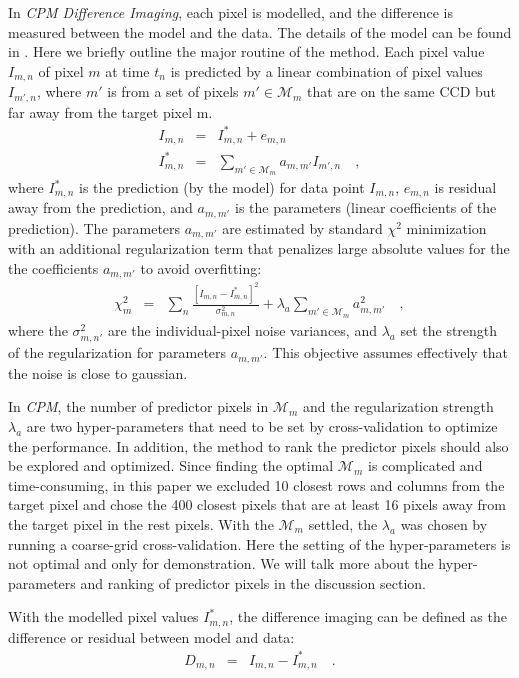 \documentclass[12pt, preprint]{aastex}
\newcommand{\project}[1]{\textsl{#1}}
\newcommand{\cpm}{\project{CPM}}
\newcommand{\cpmdiff}{\project{CPM Difference Imaging}}
\newcommand{\set}[1]{\mathcal{#1}}
\begin{document}
In \cpmdiff, each pixel is modelled, and the difference is measured between the model and the data. 
The details of the model can be found in \cite{cpm}. 
Here we briefly outline the major routine of the method. Each pixel value $I_{m,n}$ of pixel $m$ at time $t_n$ is predicted by a linear combination of pixel values $I_{m',n}$, where $m'$ is from a set of pixels $m'\in\set{M}_m$ that are on the same CCD but far away from the target pixel m.
\begin{eqnarray}
I_{m,n}         &=& I^{\ast}_{m,n} + e_{m,n}
\\
I^{\ast}_{m,n}  &=& \sum_{m'\in\set{M}_m} a_{m,m'}I_{m',n} 
\quad,
\end{eqnarray}
where $I^{\ast}_{m,n}$ is the prediction (by the model) for data point $I_{m,n}$, $e_{m,n}$ is residual away from the prediction, and $a_{m,m'}$ is the parameters (linear coefficients of the prediction).
The parameters $a_{m,m'}$ are estimated by standard $\chi^2$ minimization with an additional regularization term that penalizes large absolute values for the the coefficients $a_{m,m'}$ to avoid overfitting:
\begin{eqnarray}
\chi^2_{m}    &=& \sum_{n} \frac{[I_{m,n} - I^{\ast}_{m,n}]^2}{\sigma^2_{m,n}}+ \lambda_{a}\sum_{m'\in\set{M}_m}a_{m,m'}^2 
\quad,
\end{eqnarray}
where the $\sigma^2_{m,n'}$ are the individual-pixel noise variances, and $\lambda_{a}$ set the strength of the regularization for parameters $a_{m,m'}$.
This objective assumes effectively that the noise is close to gaussian.

In \cpm, the number of predictor pixels in $\set{M}_m$ and the regularization strength $\lambda_{a}$ are two hyper-parameters that need to be set by cross-validation to optimize the performance. 
In addition, the method to rank the predictor pixels should also be explored and optimized.
Since finding the optimal $\set{M}_m$ is complicated and time-consuming, in this paper we excluded 10 closest rows and columns from the target pixel and chose the 400 closest pixels that are at least 16 pixels away from the target pixel in the rest pixels.
With the $\set{M}_m$ settled,  the $\lambda_{a}$ was chosen by running a coarse-grid cross-validation. 
Here the setting of the hyper-parameters is not optimal and only for demonstration. 
We will talk more about the hyper-parameters and ranking of predictor pixels in the discussion section.

With the modelled pixel values $I^{\ast}_{m,n}$, the difference imaging can be defined as the difference or residual between model and data:
\begin{eqnarray}
D_{m,n} &=& I_{m,n} - I^{\ast}_{m,n}
\quad.
\end{eqnarray}
\end{document}
